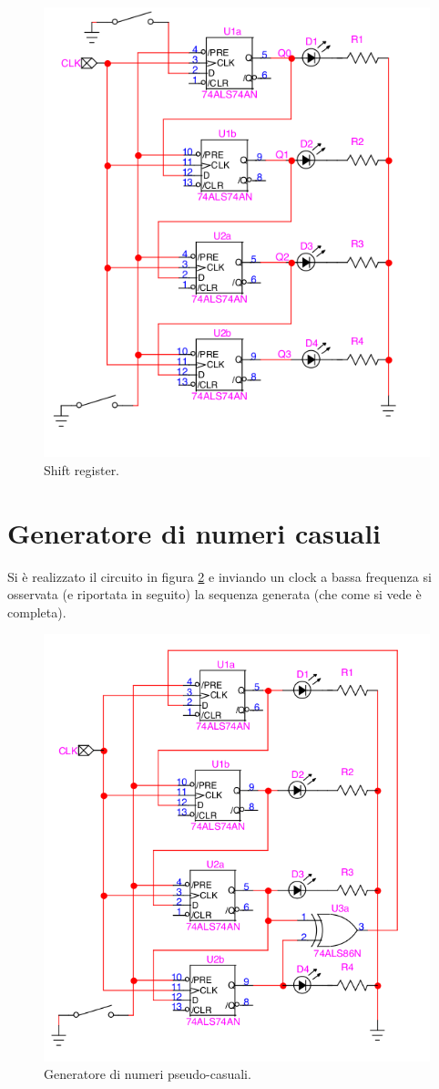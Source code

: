 \documentclass[10pt,a4paper]{article}
\begin{document}
\begin{figure}
\centering
\includegraphics[scale=0.5]{shift.png}
\caption{Shift register.\label{shift}}
\end{figure}

\section{Generatore di numeri casuali}
Si è realizzato il circuito in figura \ref{pseudo} e inviando un clock a bassa frequenza si osservata (e riportata in seguito) la sequenza generata (che come si vede è completa). 


\begin{figure}
\centering
\includegraphics[scale=0.5]{pseudi.png}
\caption{Generatore di numeri pseudo-casuali.\label{pseudo}}
\end{figure}
\end{document}
